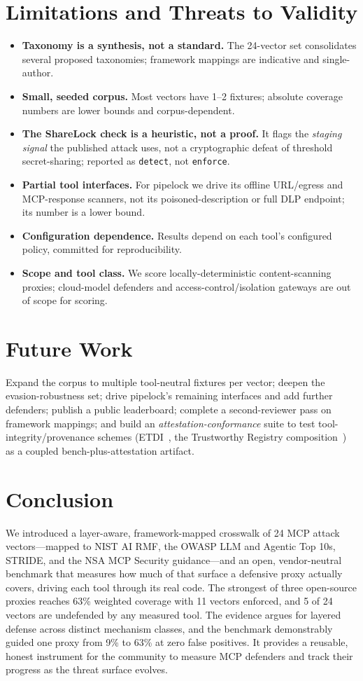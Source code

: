 \documentclass[sigconf,review,anonymous]{acmart}
\begin{document}
\section{Limitations and Threats to Validity}\label{sec:limits}
\begin{itemize}
\item \textbf{Taxonomy is a synthesis, not a standard.} The 24-vector set consolidates several proposed taxonomies; framework mappings are indicative and single-author.
\item \textbf{Small, seeded corpus.} Most vectors have 1--2 fixtures; absolute coverage numbers are lower bounds and corpus-dependent.
\item \textbf{The ShareLock check is a heuristic, not a proof.} It flags the \emph{staging signal} the published attack uses, not a cryptographic defeat of threshold secret-sharing; reported as \texttt{detect}, not \texttt{enforce}.
\item \textbf{Partial tool interfaces.} For pipelock we drive its offline URL/egress and MCP-response scanners, not its poisoned-description or full DLP endpoint; its number is a lower bound.
\item \textbf{Configuration dependence.} Results depend on each tool's configured policy, committed for reproducibility.
\item \textbf{Scope and tool class.} We score locally-deterministic content-scanning proxies; cloud-model defenders and access-control/isolation gateways are out of scope for scoring.
\end{itemize}

\section{Future Work}\label{sec:future}
Expand the corpus to multiple tool-neutral fixtures per vector; deepen the evasion-robustness set; drive pipelock's remaining interfaces and add further defenders; publish a public leaderboard; complete a second-reviewer pass on framework mappings; and build an \emph{attestation-conformance} suite to test tool-integrity/provenance schemes (ETDI~\cite{etdi2506}, the Trustworthy Registry composition~\cite{trustreg2026}) as a coupled bench-plus-attestation artifact.

\section{Conclusion}
We introduced a layer-aware, framework-mapped crosswalk of 24 MCP attack vectors---mapped to NIST AI RMF, the OWASP LLM and Agentic Top 10s, STRIDE, and the NSA MCP Security guidance---and an open, vendor-neutral benchmark that measures how much of that surface a defensive proxy actually covers, driving each tool through its real code. The strongest of three open-source proxies reaches 63\% weighted coverage with 11 vectors enforced, and 5 of 24 vectors are undefended by any measured tool. The evidence argues for layered defense across distinct mechanism classes, and the benchmark demonstrably guided one proxy from 9\% to 63\% at zero false positives. It provides a reusable, honest instrument for the community to measure MCP defenders and track their progress as the threat surface evolves.
\end{document}
